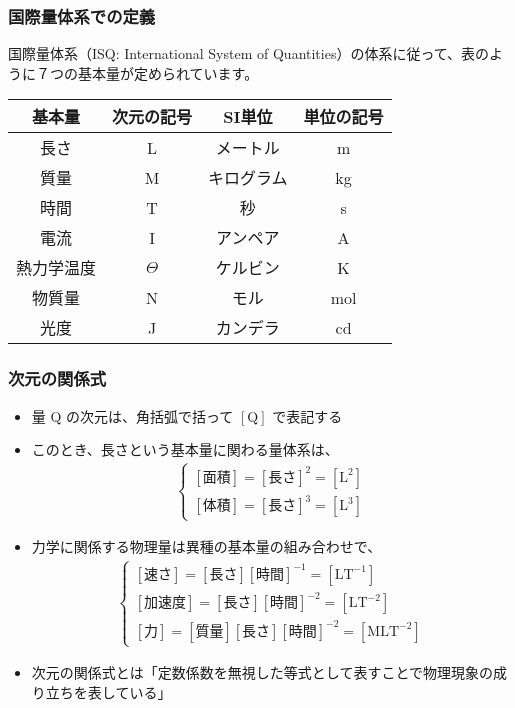 \documentclass[12pt, dvipdfmx]{beamer}
\begin{document}
\begin{frame}
	\frametitle{国際量体系での定義}

	国際量体系（ISQ: International System of Quantities）の体系に従って、表のように７つの基本量が定められています。
	\begin{center}
		\begin{tabular}{|c|c||c|c|} \hline
			基本量 		& 次元の記号 & SI単位 		& 単位の記号\\ \hline \hline
			長さ		& L			& メートル 		& m \\ \hline
			質量		& M			& キログラム 	& kg \\ \hline
			時間		& T			& 秒 			& s \\ \hline
			電流		& I			& アンペア 		& A \\ \hline
			熱力学温度	& $\Theta$	& ケルビン 		& K \\ \hline
			物質量		& N			& モル 			& mol \\ \hline
			光度		& J			& カンデラ 		& cd \\ \hline
		\end{tabular}
	\end{center}
\end{frame}

\begin{frame}
	\frametitle{次元の関係式}
	\footnotesize
	\begin{itemize}
		\item 量 $\mathrm{Q}$ の次元は、角括弧で括って $[\mathrm{Q}]$ で表記する
		\item このとき、長さという基本量に関わる量体系は、
			\begin{align*}
				\begin{cases}
					[\text{面積}] = [\text{長さ}]^2 = [\mathrm{L}^2] \\[8pt]
					[\text{体積}] = [\text{長さ}]^3 = [\mathrm{L}^3]
				\end{cases}
			\end{align*}
		\item 力学に関係する物理量は異種の基本量の組み合わせで、
			\begin{align*}
				\begin{cases}
					[\text{速さ}] = [\text{長さ}][\text{時間}]^{-1} = [\mathrm{LT}^{-1}] \\[8pt]
					[\text{加速度}] = [\text{長さ}][\text{時間}]^{-2} = [\mathrm{LT}^{-2}] \\[8pt]
					[\text{力}] = [\text{質量}][\text{長さ}][\text{時間}]^{-2} = [\mathrm{MLT}^{-2}]
				\end{cases}
				\label{eq:idou}
			\end{align*}
		\item 次元の関係式とは「定数係数を無視した等式として表すことで物理現象の成り立ちを表している」
	\end{itemize}
\end{frame}
\end{document}
